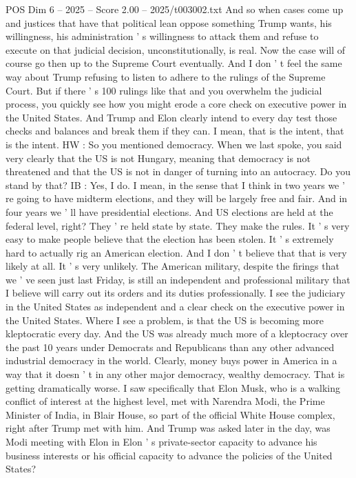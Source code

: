 \begin{textsample}{POS Dim 6 – 2025 – Score 2.00 – 2025/t003002.txt}
And so when cases come up and justices that have that political lean oppose something Trump wants, his willingness, his administration ' s willingness to attack them and refuse to execute on that judicial decision, unconstitutionally, is real.
Now the case will of course go then up to the Supreme Court eventually.
And I don ' t feel the same way about Trump refusing to listen to adhere to the rulings of the Supreme Court.
But if there ' s 100 rulings like that and you overwhelm the judicial process, you quickly see how you might erode a core check on executive power in the United States.
And Trump and Elon clearly intend to every day test those checks and balances and break them if they can.
I mean, that is the intent, that is the intent.
HW : So you mentioned democracy.
When we last spoke, you said very clearly that the US is not Hungary, meaning that democracy is not threatened and that the US is not in danger of turning into an autocracy.
Do you stand by that?
IB : Yes, I do.
I mean, in the sense that I think in two years we ' re going to have midterm elections, and they will be largely free and fair.
And in four years we ' ll have presidential elections.
And US elections are held at the federal level, right?
They ' re held state by state.
They make the rules.
It ' s very easy to make people believe that the election has been stolen.
It ' s extremely hard to actually rig an American election.
And I don ' t believe that that is very likely at all.
It ' s very unlikely.
The American military, despite the firings that we ' ve seen just last Friday, is still an independent and professional military that I believe will carry out its orders and its duties professionally.
I see the judiciary in the United States as independent and a clear check on the executive power in the United States.
Where I see a problem, is that the US is becoming more kleptocratic every day.
And the US was already much more of a kleptocracy over the past 10 years under Democrats and Republicans than any other advanced industrial democracy in the world.
Clearly, money buys power in America in a way that it doesn ' t in any other major democracy, wealthy democracy.
That is getting dramatically worse.
I saw specifically that Elon Musk, who is a walking conflict of interest at the highest level, met with Narendra Modi, the Prime Minister of India, in Blair House, so part of the official White House complex, right after Trump met with him.
And Trump was asked later in the day, was Modi meeting with Elon in Elon ' s private-sector capacity to advance his business interests or his official capacity to advance the policies of the United States?

\end{textsample}
